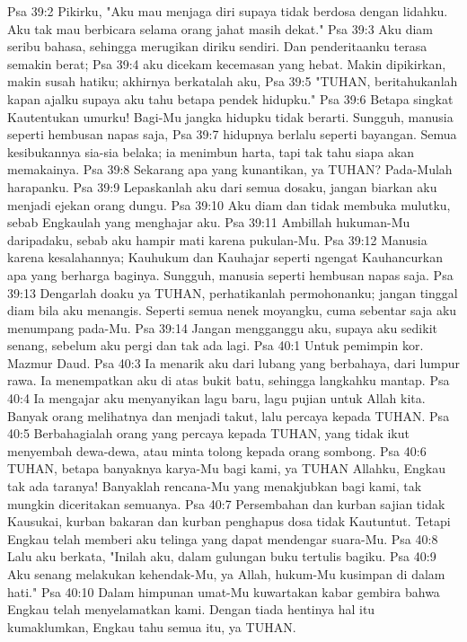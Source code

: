 Psa 39:2  Pikirku, "Aku mau menjaga diri supaya tidak berdosa dengan lidahku. Aku tak mau berbicara selama orang jahat masih dekat."
Psa 39:3  Aku diam seribu bahasa, sehingga merugikan diriku sendiri. Dan penderitaanku terasa semakin berat;
Psa 39:4  aku dicekam kecemasan yang hebat. Makin dipikirkan, makin susah hatiku; akhirnya berkatalah aku,
Psa 39:5  "TUHAN, beritahukanlah kapan ajalku supaya aku tahu betapa pendek hidupku."
Psa 39:6  Betapa singkat Kautentukan umurku! Bagi-Mu jangka hidupku tidak berarti. Sungguh, manusia seperti hembusan napas saja,
Psa 39:7  hidupnya berlalu seperti bayangan. Semua kesibukannya sia-sia belaka; ia menimbun harta, tapi tak tahu siapa akan memakainya.
Psa 39:8  Sekarang apa yang kunantikan, ya TUHAN? Pada-Mulah harapanku.
Psa 39:9  Lepaskanlah aku dari semua dosaku, jangan biarkan aku menjadi ejekan orang dungu.
Psa 39:10  Aku diam dan tidak membuka mulutku, sebab Engkaulah yang menghajar aku.
Psa 39:11  Ambillah hukuman-Mu daripadaku, sebab aku hampir mati karena pukulan-Mu.
Psa 39:12  Manusia karena kesalahannya; Kauhukum dan Kauhajar seperti ngengat Kauhancurkan apa yang berharga baginya. Sungguh, manusia seperti hembusan napas saja.
Psa 39:13  Dengarlah doaku ya TUHAN, perhatikanlah permohonanku; jangan tinggal diam bila aku menangis. Seperti semua nenek moyangku, cuma sebentar saja aku menumpang pada-Mu.
Psa 39:14  Jangan mengganggu aku, supaya aku sedikit senang, sebelum aku pergi dan tak ada lagi.
Psa 40:1  Untuk pemimpin kor. Mazmur Daud.
Psa 40:3  Ia menarik aku dari lubang yang berbahaya, dari lumpur rawa. Ia menempatkan aku di atas bukit batu, sehingga langkahku mantap.
Psa 40:4  Ia mengajar aku menyanyikan lagu baru, lagu pujian untuk Allah kita. Banyak orang melihatnya dan menjadi takut, lalu percaya kepada TUHAN.
Psa 40:5  Berbahagialah orang yang percaya kepada TUHAN, yang tidak ikut menyembah dewa-dewa, atau minta tolong kepada orang sombong.
Psa 40:6  TUHAN, betapa banyaknya karya-Mu bagi kami, ya TUHAN Allahku, Engkau tak ada taranya! Banyaklah rencana-Mu yang menakjubkan bagi kami, tak mungkin diceritakan semuanya.
Psa 40:7  Persembahan dan kurban sajian tidak Kausukai, kurban bakaran dan kurban penghapus dosa tidak Kautuntut. Tetapi Engkau telah memberi aku telinga yang dapat mendengar suara-Mu.
Psa 40:8  Lalu aku berkata, "Inilah aku, dalam gulungan buku tertulis bagiku.
Psa 40:9  Aku senang melakukan kehendak-Mu, ya Allah, hukum-Mu kusimpan di dalam hati."
Psa 40:10  Dalam himpunan umat-Mu kuwartakan kabar gembira bahwa Engkau telah menyelamatkan kami. Dengan tiada hentinya hal itu kumaklumkan, Engkau tahu semua itu, ya TUHAN.

